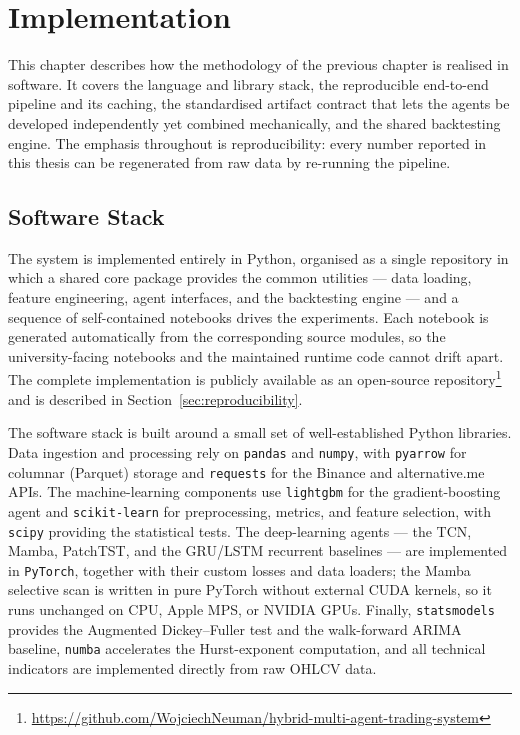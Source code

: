 \chapter{Implementation}
\label{05_Implementation}

This chapter describes how the methodology of the previous chapter is realised in software. It covers the language and library stack, the reproducible end-to-end pipeline and its caching, the standardised artifact contract that lets the agents be developed independently yet combined mechanically, and the shared backtesting engine. The emphasis throughout is reproducibility: every number reported in this thesis can be regenerated from raw data by re-running the pipeline.


\section{Software Stack}
\label{sec:software_stack}

The system is implemented entirely in Python, organised as a single repository in which a shared core package provides the common utilities --- data loading, feature engineering, agent interfaces, and the backtesting engine --- and a sequence of self-contained notebooks drives the experiments. Each notebook is generated automatically from the corresponding source modules, so the university-facing notebooks and the maintained runtime code cannot drift apart. The complete implementation is publicly available as an open-source repository\footnote{\url{https://github.com/WojciechNeuman/hybrid-multi-agent-trading-system}} and is described in Section~\ref{sec:reproducibility}.


The software stack is built around a small set of well-established Python libraries. Data ingestion and processing rely on \texttt{pandas} and \texttt{numpy}, with \texttt{pyarrow} for columnar (Parquet) storage and \texttt{requests} for the Binance and alternative.me APIs. The machine-learning components use \texttt{lightgbm} for the gradient-boosting agent and \texttt{scikit-learn} for preprocessing, metrics, and feature selection, with \texttt{scipy} providing the statistical tests. The deep-learning agents --- the TCN, Mamba, PatchTST, and the GRU/LSTM recurrent baselines --- are implemented in \texttt{PyTorch}, together with their custom losses and data loaders; the Mamba selective scan is written in pure PyTorch without external CUDA kernels, so it runs unchanged on CPU, Apple MPS, or NVIDIA GPUs. Finally, \texttt{statsmodels} provides the Augmented Dickey--Fuller test and the walk-forward ARIMA baseline, \texttt{numba} accelerates the Hurst-exponent computation, and all technical indicators are implemented directly from raw OHLCV data.

